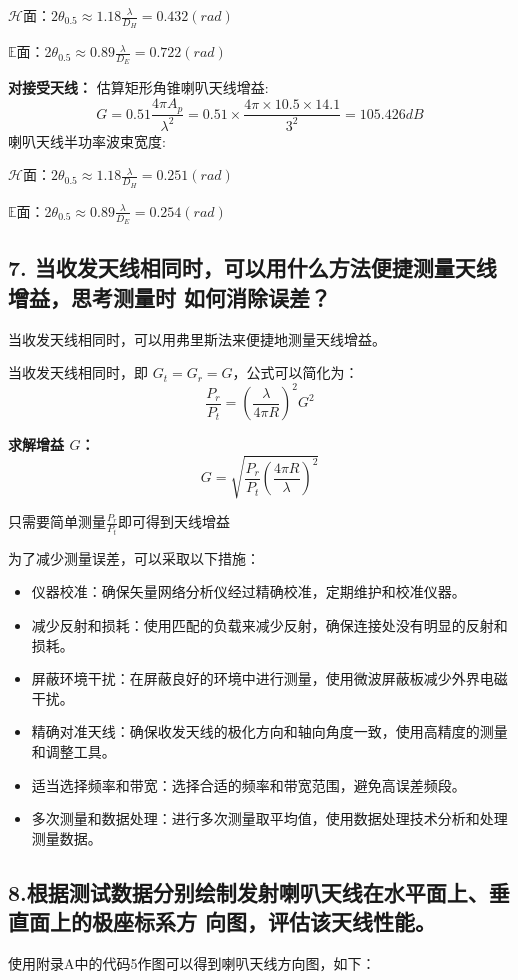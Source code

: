 \documentclass[12pt,hyperref,a4paper,UTF8]{ctexart}
\begin{document}
${\mathcal{H}}$面：$2\theta_0.5\approx1.18\frac\lambda{D_H}=0.432(rad)$

$\mathbb{E}$面：2$\theta_0.5\approx0.89\frac\lambda{D_E}=0.722(rad)$

\textbf{对接受天线：}
估算矩形角锥喇叭天线增益:
\[
G = 0.51 \frac{4\pi A_p}{\lambda^2} =0.51\times\frac{4\pi \times 10.5 \times 14.1}{3^2}= 105.426dB
\]
喇叭天线半功率波束宽度:


${\mathcal{H}}$面：$2\theta_0.5\approx1.18\frac\lambda{D_H}=0.251(rad)$

$\mathbb{E}$面：2$\theta_0.5\approx0.89\frac\lambda{D_E}=0.254(rad)$

\subsection*{7. 当收发天线相同时，可以用什么方法便捷测量天线增益，思考测量时
如何消除误差？}
当收发天线相同时，可以用弗里斯法来便捷地测量天线增益。

当收发天线相同时，即 $G_t = G_r = G$，公式可以简化为：
\[
\frac{P_r}{P_t} = \left( \frac{\lambda}{4\pi R} \right)^2 G^2
\]

\textbf{求解增益 $G$：}
\[
G = \sqrt{ \frac{P_r}{P_t} \left( \frac{4\pi R}{\lambda} \right)^2 }
\]

只需要简单测量$\frac{P_r}{P_t} $即可得到天线增益


为了减少测量误差，可以采取以下措施：
\begin{itemize}
    \item 仪器校准：确保矢量网络分析仪经过精确校准，定期维护和校准仪器。
    \item 减少反射和损耗：使用匹配的负载来减少反射，确保连接处没有明显的反射和损耗。
    \item 屏蔽环境干扰：在屏蔽良好的环境中进行测量，使用微波屏蔽板减少外界电磁干扰。
    \item 精确对准天线：确保收发天线的极化方向和轴向角度一致，使用高精度的测量和调整工具。
    \item 适当选择频率和带宽：选择合适的频率和带宽范围，避免高误差频段。
    \item 多次测量和数据处理：进行多次测量取平均值，使用数据处理技术分析和处理测量数据。
\end{itemize}






\subsection*{8.根据测试数据分别绘制发射喇叭天线在水平面上、垂直面上的极座标系方
向图，评估该天线性能。}
使用附录A中的代码5作图可以得到喇叭天线方向图，如下：
\end{document}
